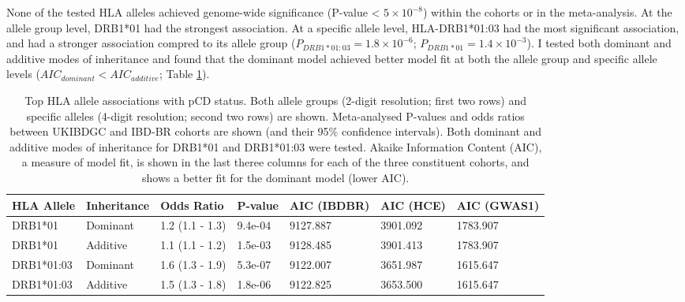 None of the tested HLA alleles achieved genome-wide significance (P-value < $5\times10^{-8}$) within the cohorts or in the meta-analysis. At the allele group level, DRB1*01 had the strongest association. At a specific allele level, HLA-DRB1*01:03 had the most significant association, and had a stronger association compred to its allele group ($P_{DRB1*01:03}=1.8\times10^{-6}$; $P_{DRB1*01}=1.4\times10^{-3}$). I tested both dominant and additive modes of inheritance and found that the dominant model achieved better model fit at both the allele group and specific allele levels ($AIC_{dominant} < AIC_{additive}$; Table \ref{table:hla_allele_assoc}). 
\begin{table}[H]
  
  \centering\begingroup\fontsize{9}{10}\selectfont
  \caption{Top HLA allele associations with pCD status. Both allele groups (2-digit resolution; first two rows) and specific alleles (4-digit resolution; second two rows) are shown. Meta-analysed P-values and odds ratios between UKIBDGC and IBD-BR cohorts are shown (and their 95\% confidence intervals). Both dominant and additive modes of inheritance  for  DRB1*01 and DRB1*01:03 were tested. Akaike Information Content (AIC), a measure of model fit, is shown in the last theree columns for each of the three constituent cohorts, and shows a better fit for the dominant model (lower AIC).}
  \label{table:hla_allele_assoc}
  \begin{tabular}[t]{|l|l|l|l|l|l|l|}
  \hline
  HLA Allele & Inheritance & Odds Ratio & P-value & AIC (IBDBR) & AIC (HCE) & AIC (GWAS1)\\
  \hline
  DRB1*01 & Dominant & 1.2 (1.1 - 1.3) & 9.4e-04 & 9127.887 & 3901.092 & 1783.907\\
  \hline
  DRB1*01 & Additive & 1.1 (1.1 - 1.2) & 1.5e-03 & 9128.485 & 3901.413 & 1783.907\\
  \hline
  DRB1*01:03 & Dominant & 1.6 (1.3 - 1.9) & 5.3e-07 & 9122.007 & 3651.987 & 1615.647\\
\hline
DRB1*01:03 & Additive & 1.5 (1.3 - 1.8) & 1.8e-06 & 9122.825 & 3653.500 & 1615.647\\
\hline
  \end{tabular}
  \endgroup{}
  \end{table}
